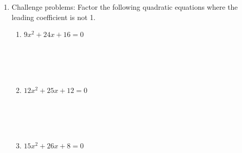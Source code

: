 \documentclass[12pt]{article}
\begin{document}
\begin{enumerate}
    \item Challenge problems: Factor the following quadratic equations where the leading coefficient is not 1.
    \begin{enumerate}
        \item $9x^2 + 24x + 16 = 0$
        \[
        \begin{array}{c}
        \\ \\ \\ \\ \\ \\ \\ \\ \\ \\ \\ \\
        \end{array}
        \]

        \item $12x^2 + 25x + 12 = 0$
        \[
        \begin{array}{c}
        \\ \\ \\ \\ \\ \\ \\ \\ \\ \\ \\ \\
        \end{array}
        \]

        \item $15x^2 + 26x + 8 = 0$
        \[
        \begin{array}{c}
        \\ \\ \\ \\ \\ \\ \\ \\ \\ \\ \\ \\
        \end{array}
        \]
    \end{enumerate}
\end{enumerate}
\end{document}
